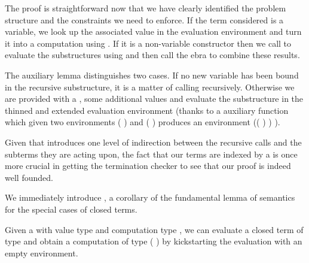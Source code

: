 \begin{agdasnippet}
\end{agdasnippet}

The \semfun{} proof is straightforward now that we have clearly
identified the problem structure and the constraints we need to enforce.
If the term considered is a variable, we look up the associated value in
the evaluation environment and turn it into a computation using .
If it is a non-variable constructor then we call  to evaluate the
substructures using  and then call the ebra to combine
these results.

\begin{agdasnippet}
\end{agdasnippet}

The auxiliary lemma  distinguishes two cases. If no new
variable has been bound in the recursive substructure, it is
a matter of calling \semfun{} recursively. Otherwise we are provided
with a , some additional values and evaluate the
substructure in the thinned and extended evaluation environment
(thanks to a auxiliary function \AF{\_>>\_} which given two environments
{( )  } and {( )  }
produces an environment {(( \AF{++} ) )  )}.

\begin{agdasnippet}
\end{agdasnippet}

Given that  introduces one level of indirection between the
recursive calls and the subterms they are acting upon, the fact
that our terms are indexed by a  is once more crucial in
getting the termination checker to see that our proof is indeed
well founded.

We immediately introduce , a corollary of the fundamental lemma of
semantics for the special cases of closed terms.

\begin{agdasnippet}
\end{agdasnippet}

Given a  with value type  and computation type ,
we can evaluate a closed term of type  and obtain a computation of
type {(  \AIC{[]})} by kickstarting the evaluation with an
empty environment.


